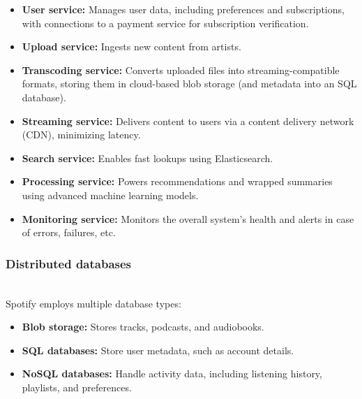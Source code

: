 \begin{itemize}
\item
\protect{}\label{p-riayDpknpFBldSUGZT3}
\textbf{User service:} Manages user data, including preferences and subscriptions, with connections to a payment service for subscription verification.
\item
\protect{}\label{dmlQnLYLbfyS9qMIDJUNs}
\textbf{Upload service:} Ingests new content from artists.~
\item
\protect{}\label{tCU6gPFV85LRABD4nSrNO}
\textbf{Transcoding service:} Converts uploaded files into streaming-compatible formats, storing them in cloud-based blob storage (and metadata into an SQL database).
\item
\protect{}\label{3EvDfJzCLdgogpMYFkjVQ}
\textbf{Streaming service:} Delivers content to users via a content delivery network (CDN), minimizing latency.
\item
\protect{}\label{qNqaet32VKeUwxNMvxoUl}
\textbf{Search service:} Enables fast lookups using Elasticsearch.
\item
\protect{}\label{_YmJQXt3dKZZAC8uA5wcv}
\textbf{Processing service:} Powers recommendations and wrapped summaries using advanced machine learning models.
\item
\protect{}\label{d05qTmv4Yfj5rlPA3KVw9}
\textbf{Monitoring service:} Monitors the overall system's health and alerts in case of errors, failures, etc.
\end{itemize}

\subsubsection{Distributed databases}\label{589uHY8tV51R2sPuWNYNu}
\\
Spotify employs multiple database types:

\begin{itemize}
\item
\protect{}\label{r-He-pHPDRR-CCUeTj2fr}
\textbf{Blob storage:} Stores tracks, podcasts, and audiobooks.
\item
\protect{}\label{_yZyDdXC5qXqLjvVRX9Q_}
\textbf{SQL databases:} Store user metadata, such as account details.
\item
\protect{}\label{C3b5QlpqoSzWUUWLwbRbd}
\textbf{NoSQL databases:} Handle activity data, including listening history, playlists, and preferences.
\end{itemize}

